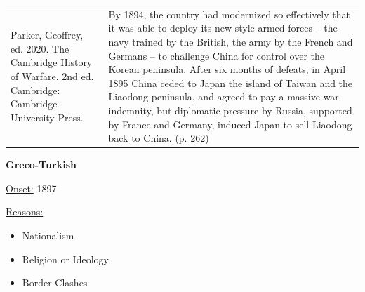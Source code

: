 {\begin{longtable}{p{}p{}}
\\
Parker, Geoffrey, ed. 2020. The Cambridge History of Warfare. 2nd ed. Cambridge: Cambridge University Press. & By 1894, the country had modernized so effectively that it was able to deploy its new-style armed forces – the navy trained by the British, the army by the French and Germans – to challenge China for control over the Korean peninsula. After six months of defeats, in April 1895 China ceded to Japan the island of Taiwan and the Liaodong peninsula, and agreed to pay a massive war indemnity, but diplomatic pressure by Russia, supported by France and Germany, induced Japan to sell Liaodong back to China. (p. 262)
\\
\end{longtable}}
\clearpage
         \textbf{Greco-Turkish} 

          \underline{Onset:} 1897         

\underline{Reasons:}
\begin{itemize}
\item Nationalism
\item Religion or Ideology
\item Border Clashes
\end{itemize}


